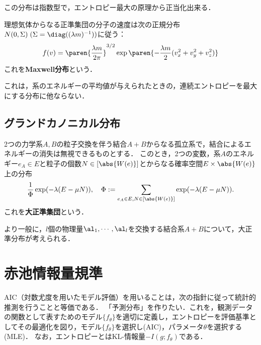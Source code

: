 \documentclass[uplatex,dvipdfmx]{jsreport}
\begin{document}
\begin{remarks}
    この分布は指数型で，エントロピー最大の原理から正当化出来る．
\end{remarks}

\begin{proposition}
    理想気体からなる正準集団の分子の速度は次の正規分布$N(0,\Sigma)\;(\Sigma=\diag((\lambda m)^{-1}))$に従う：
    \[f(v)=\paren{\frac{\lambda m}{2\pi}}^{3/2}\exp\paren{-\frac{\lambda m}{2}(v^2_x+v^2_y+v^2_z)}\]
    これを\textbf{Maxwell分布}という．
\end{proposition}
\begin{remarks}
    これは，系のエネルギーの平均値が与えられたときの，連続エントロピーを最大にする分布に他ならない．
\end{remarks}

\subsection{グランドカノニカル分布}

\begin{model}
    2つの力学系$A,B$の粒子交換を伴う結合$A+B$からなる孤立系で，結合によるエネルギーの消失は無視できるものとする．
    このとき，2つの変数，系$A$のエネルギー$e_A\in E$と粒子の個数$N\in [\abs{W(e)}]$とからなる確率空間$E\times\abs{W(e)}$上の分布
    \[\frac{1}{\Phi}\exp(-\lambda(E-\mu N)),\quad\Phi:=\sum_{e_A\in E,N\in[\abs{W(e)}]}\exp(-\lambda(E-\mu N)).\]
    これを\textbf{大正準集団}という．
\end{model}
\begin{remark}
    より一般に，$l$個の物理量$\al_1,\cdots,\al_l$を交換する結合系$A+B$について，大正準分布が考えられる．
\end{remark}

\section{赤池情報量規準}

\begin{tcolorbox}[colframe=ForestGreen, colback=ForestGreen!10!white,breakable,colbacktitle=ForestGreen!40!white,coltitle=black,fonttitle=\bfseries\sffamily,
title=]
    AIC（対数尤度を用いたモデル評価）を用いることは，次の指針に従って統計的推測を行うことと等価である\cite{赤池76}．
    「予測分布」を作りたい．これを，観測データの関数として表すためのモデル$\{f_\theta\}$を適切に定義し，エントロピーを評価基準としてその最適化を図り，モデル$\{f_\theta\}$を選択し(AIC)，パラメータ$\theta$を選択する(MLE)．
    なお，エントロピーとはKL-情報量$-I(g;f_\theta)$である．
\end{tcolorbox}
\end{document}
